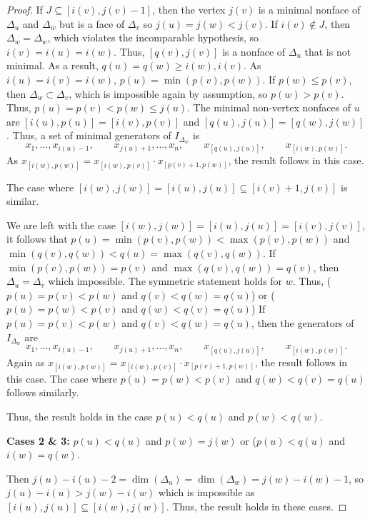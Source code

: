 \begin{proof}
    If $J \subseteq [i(v),j(v)-1]$, then the vertex $j(v)$ is a minimal nonface of $\Delta_u$ and $\Delta_w$ but is a face of $\Delta_v$ so $j(u)=j(w)<j(v)$.
    If $i(v)\not\in J$, then $\Delta_w = \Delta_w$, which violates the incomparable hypothesis, so $i(v) = i(u) = i(w)$.
    Thus, $[q(v),j(v)]$ is a nonface of $\Delta_u$ that is not minimal.
    As a result, $q(u)=q(w)\geq i(w),i(v)$.
    As $i(u)=i(v)=i(w)$, $p(u) =\min(p(v),p(w))$.
    If $p(w)\leq p(v)$, then $\Delta_w\subset \Delta_v$, which is impossible again by assumption, so $p(w)>p(v)$.
    Thus, $p(u) = p(v)<p(w)\leq j(u)$.
    The minimal non-vertex nonfaces of $u$ are $[i(u),p(u)] = [i(v),p(v)]$ and $[q(u),j(u)]= [q(w),j(w)]$.
    Thus, a set of minimal generators of $I_{\Delta_w}$ is
    \[x_1,\dots,x_{i(u)-1},\qquad x_{j(u)+1},\dots,x_n,\qquad x_{[q(u),j(u)]},\qquad x_{[i(w),p(w)]}.\]
    As $x_{[i(w),p(w)]} = x_{[i(w),p(v)]}\cdot x_{[p(v)+1,p(w)]}$, the result follows in this case.
    
    The case where $[i(w),j(w)]= [i(u),j(u)] \subseteq [i(v)+1,j(v)]$ is similar.

    We are left with the case  $[i(w),j(w)]= [i(u),j(u)] = [i(v),j(v)]$, it follows that $p(u)=\min(p(v),p(w))< \max(p(v),p(w))$ and $\min(q(v),q(w))<q(u) = \max(q(v),q(w))$.
    If \newline $\min(p(v),p(w)) = p(v)$ and $\max(q(v),q(w)) = q(v)$, then $\Delta_u=\Delta_v$ which impossible.
    The symmetric statement holds for $w$.
    Thus, ($p(u) = p(v)<p(w)$ and $q(v)<q(w)=q(u)$) or ($p(u) = p(w)<p(v)$ and $q(w)<q(v)=q(u)$)
    If  $p(u) = p(v)<p(w)$ and $q(v)<q(w)=q(u)$, then the generators of $I_{\Delta_w}$ are
    \[x_1,\dots,x_{i(u)-1},\qquad x_{j(u)+1},\dots,x_n,\qquad x_{[q(u),j(u)]},\qquad x_{[i(w),p(w)]}.\]
    Again as $x_{[i(w),p(w)]} = x_{[i(w),p(v)]}\cdot x_{[p(v)+1,p(w)]}$, the result follows in this case.
    The case where $p(u) = p(w)<p(v)$ and $q(w)<q(v)=q(u)$ follows similarly.

    Thus, the result holds in the case $p(u)<q(u)$ and $p(w)<q(w)$.

    \medskip

    \noindent\textbf{Cases 2 \& 3: } $p(u)<q(u)$ and $p(w)=j(w)$ or ($p(u)<q(u)$ and $i(w)=q(w)$.

    \medskip
    
    Then  $j(u)-i(u)-2 = \dim(\Delta_u) = \dim(\Delta_w) = j(w)-i(w)-1$, so $j(u)-i(u)>j(w)-i(w)$ which is impossible as $[i(u),j(u)]\subseteq [i(w),j(w)]$.
    Thus, the result holds in these cases.


\end{proof}
